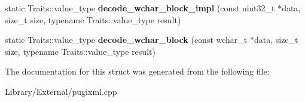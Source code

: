 \begin{DoxyCompactItemize}
\item 
\hypertarget{structutf__decoder_a3bd423d3ce99b245c76be8a0796d951b}{}static Traits\+::value\+\_\+type {\bfseries decode\+\_\+wchar\+\_\+block\+\_\+impl} (const uint32\+\_\+t $\ast$data, size\+\_\+t size, typename Traits\+::value\+\_\+type result)\label{structutf__decoder_a3bd423d3ce99b245c76be8a0796d951b}

\item 
\hypertarget{structutf__decoder_a5953fd0661c64408e08161342e4c538d}{}static Traits\+::value\+\_\+type {\bfseries decode\+\_\+wchar\+\_\+block} (const wchar\+\_\+t $\ast$data, size\+\_\+t size, typename Traits\+::value\+\_\+type result)\label{structutf__decoder_a5953fd0661c64408e08161342e4c538d}

\end{DoxyCompactItemize}


The documentation for this struct was generated from the following file\+:\begin{DoxyCompactItemize}
\item 
Library/\+External/pugixml.\+cpp\end{DoxyCompactItemize}
